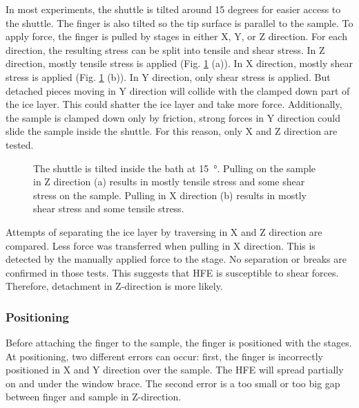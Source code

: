 


In most experiments, the shuttle is tilted around 15 degrees for easier access to the shuttle. The finger is also tilted so the tip surface is parallel to the sample. To apply force, the finger is pulled by stages in either X, Y, or Z direction. For each direction, the resulting stress can be split into tensile and shear stress. In Z direction, mostly tensile stress is applied (Fig. \ref{fig:tensilevsshear} (a)). In X direction, mostly shear stress is applied (Fig. \ref{fig:tensilevsshear} (b)). In Y direction, only shear stress is applied. But detached pieces moving in Y direction will collide with the clamped down part of the ice layer. This could shatter the ice layer and take more force. Additionally, the sample is clamped down only by friction, strong forces in Y direction could slide the sample inside the shuttle. For this reason, only X and Z direction are tested.

\begin{figure}[hbt!]
	\centering
	
	\caption{The shuttle is tilted inside the bath at \SI{15}{\degree}. Pulling on the sample in Z direction (a) results in mostly tensile stress and some shear stress on the sample. Pulling in X direction (b) results in mostly shear stress and some tensile stress.}
	\label{fig:tensilevsshear}
\end{figure}

Attempts of separating the ice layer by traversing in X and Z direction are compared. Less force was transferred when pulling in X direction. This is detected by the manually applied force to the stage. No separation or breaks are confirmed in those tests. This suggests that HFE is susceptible to shear forces. Therefore, detachment in Z-direction is more likely. 

\subsubsection{Positioning}

Before attaching the finger to the sample, the finger is positioned with the stages. At positioning, two different errors can occur: first, the finger is incorrectly positioned in X and Y direction over the sample. The HFE will spread partially on and under the window brace. The second error is a too small or too big gap between finger and sample in Z-direction. 

